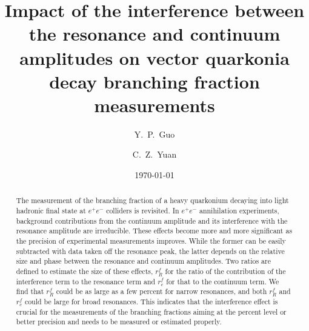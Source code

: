 \documentclass[%
preprint,
 amsmath,amssymb,
 aps,
]{revtex4-2}
\newcommand{\EE}{e^+e^-}
\begin{document}

\title{Impact of the interference between the resonance and continuum amplitudes on
vector quarkonia decay branching fraction measurements}%

\author{Y.~P.~Guo}
\author{C.~Z.~Yuan}%
%


\date{\today}%

\begin{abstract}

The measurement of the branching fraction of a heavy quarkonium decaying into light hadronic 
final state at $\EE$ colliders is revisited. In $\EE$ annihilation experiments, 
background contributions from the continuum amplitude and its interference with the resonance 
amplitude are irreducible.  These effects become more and more significant as the precision of 
experimental measurements improves. While the former can be easily subtracted with data taken 
off the resonance peak, the latter depends on the relative size and phase between the resonance 
and continuum amplitudes. Two ratios are defined to estimate the size of these effects, 
$r_{R}^{f}$ for the ratio of the contribution of the interference term to the resonance term and 
$r_{c}^{f}$ for that to the continuum term. 
We find that $r_{R}^{f}$ could be as large as a few percent for narrow resonances, and both 
$r_{R}^{f}$ and $r_{c}^{f}$ could be large for broad resonances. This 
indicates that the interference effect is crucial for the measurements
of the branching fractions
aiming at the percent level or better precision and needs to be measured or estimated
properly. 

\end{abstract}

\maketitle
\end{document}
